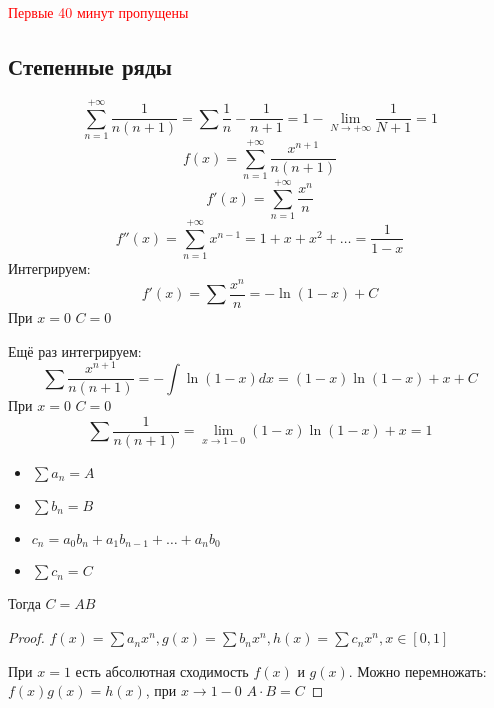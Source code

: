 

\cfoot{}



\textcolor{red}{Первые 40 минут пропущены}

\subsection*{Степенные ряды}


\begin{example}
    \[\sum_{n = 1}^{ +\infty} \frac{1}{n(n + 1)} = \sum \frac{1}{n} - \frac{1}{n + 1} = 1 - \lim_{N\to +\infty} \frac{1}{N + 1} = 1\]
    \[f(x) = \sum_{n = 1}^{ +\infty} \frac{x^{n + 1}}{n(n + 1)}\]
    \[f'(x) = \sum_{n = 1}^{ +\infty} \frac{x^{n}}{n}\]
    \[f''(x) = \sum_{n = 1}^{ +\infty} x^{n - 1} = 1 + x + x^2 + \dots = \frac{1}{1 - x}\]
    Интегрируем:
    \[f'(x) = \sum \frac{x^n}{n} = -\ln(1 - x) + C\]
    При \(x = 0\) \(C = 0\)

    Ещё раз интегрируем:
    \[\sum \frac{x^{n + 1}}{n(n + 1)} = -\int \ln(1 - x) dx = (1 - x)\ln{(1 - x)} + x + C\]
    При \(x = 0\) \(C = 0\)
    \[\sum \frac{1}{n(n + 1)} = \lim_{x\to 1 - 0} (1 - x)\ln(1 - x) + x = 1\]
\end{example}

\begin{corollary}[т. Абеля]\itemfix
    \begin{itemize}
        \item \(\sum a_n = A\)
        \item \(\sum b_n = B\)
        \item \(c_n = a_0b_n + a_1 b_{n - 1} + \dots + a_n b_0\)
        \item \(\sum c_n = C\)
    \end{itemize}
    Тогда \(C = AB\)
\end{corollary}
\begin{proof}
    \(f(x) = \sum a_n x^n, g(x) = \sum b_n x^n, h(x) = \sum c_nx^n, x\in[0, 1]\)

    При \(x = 1\) есть абсолютная сходимость \(f(x)\) и \(g(x)\). Можно перемножать: \(f(x)g(x) = h(x)\), при \(x\to 1 - 0\) \(A\cdot B = C\)
\end{proof}

